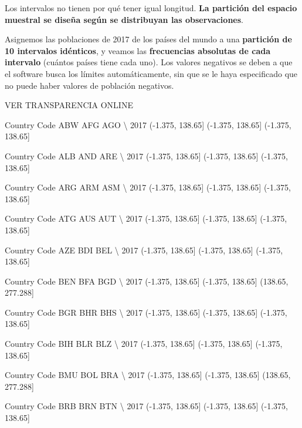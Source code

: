 \documentclass[11pt]{article}
\begin{document}
Los intervalos no tienen por qué tener igual longitud. \textbf{La
partición del espacio muestral se diseña según se distribuyan las
observaciones}.

    Asignemos las poblaciones de 2017 de los países del mundo a una
\textbf{partición de 10 intervalos idénticos}, y veamos las
\textbf{frecuencias absolutas de cada intervalo} (cuántos países tiene
cada uno). Los valores negativos se deben a que el software busca los
límites automáticamente, sin que se le haya especificado que no puede
haber valores de población negativos.

VER TRANSPARENCIA ONLINE


Country Code               ABW               AFG               AGO  \textbackslash{}
2017          (-1.375, 138.65]  (-1.375, 138.65]  (-1.375, 138.65]   

Country Code               ALB               AND               ARE  \textbackslash{}
2017          (-1.375, 138.65]  (-1.375, 138.65]  (-1.375, 138.65]   

Country Code               ARG               ARM               ASM  \textbackslash{}
2017          (-1.375, 138.65]  (-1.375, 138.65]  (-1.375, 138.65]   

Country Code               ATG               AUS               AUT  \textbackslash{}
2017          (-1.375, 138.65]  (-1.375, 138.65]  (-1.375, 138.65]   

Country Code               AZE               BDI               BEL  \textbackslash{}
2017          (-1.375, 138.65]  (-1.375, 138.65]  (-1.375, 138.65]   

Country Code               BEN               BFA                BGD  \textbackslash{}
2017          (-1.375, 138.65]  (-1.375, 138.65]  (138.65, 277.288]   

Country Code               BGR               BHR               BHS  \textbackslash{}
2017          (-1.375, 138.65]  (-1.375, 138.65]  (-1.375, 138.65]   

Country Code               BIH               BLR               BLZ  \textbackslash{}
2017          (-1.375, 138.65]  (-1.375, 138.65]  (-1.375, 138.65]   

Country Code               BMU               BOL                BRA  \textbackslash{}
2017          (-1.375, 138.65]  (-1.375, 138.65]  (138.65, 277.288]   

Country Code               BRB               BRN               BTN  \textbackslash{}
2017          (-1.375, 138.65]  (-1.375, 138.65]  (-1.375, 138.65]   
\end{document}
